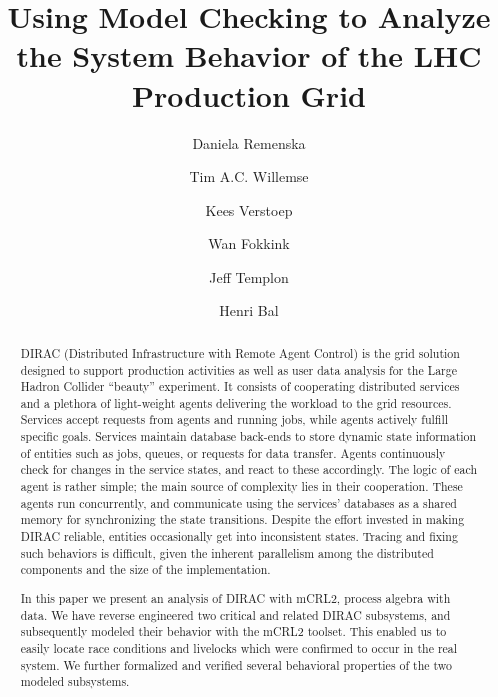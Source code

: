\documentclass[10pt,conference]{IEEEtran}
\begin{document}
\title{Using Model Checking to Analyze the System Behavior of the LHC Production Grid}
\author[1,3]{Daniela Remenska}
\author[2]{Tim A.C. Willemse}
\author[1]{Kees Verstoep}
\author[1]{Wan Fokkink}
\author[3]{Jeff Templon}
\author[1]{Henri Bal}


\maketitle

\begin{abstract}
DIRAC (Distributed Infrastructure with Remote Agent Control) is the grid
solution designed to support production activities as well as user data analysis
for the Large Hadron Collider ``beauty'' experiment. It consists of cooperating
distributed services and a plethora of light-weight agents delivering the
workload to the grid resources.  Services accept requests from agents and
running jobs, while agents actively fulfill specific goals. Services maintain
database back-ends to store dynamic state information of entities such as jobs,
queues, or requests for data transfer. Agents continuously check for changes in the
service states, and react to these accordingly. The logic of each agent is
rather simple; the main source of complexity lies in their cooperation. These
agents run concurrently, and communicate using the services' databases as a
shared memory for synchronizing the state transitions. Despite the effort
invested in making DIRAC reliable, entities occasionally get into inconsistent
states. Tracing and fixing such behaviors is difficult, given the inherent
parallelism among the distributed components and the size of the
implementation.

In this paper we present an analysis of DIRAC with mCRL2, process algebra with
data. We have reverse engineered two critical and related DIRAC subsystems, and
subsequently modeled their behavior with the mCRL2 toolset. This enabled us to
easily locate race conditions and livelocks which were confirmed to occur in the
real system. We further formalized and verified several behavioral properties of
the two modeled subsystems.
\end{abstract}
\end{document}
